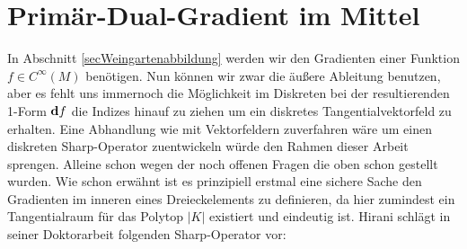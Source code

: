 \section{Primär-Dual-Gradient im Mittel}

  In Abschnitt \ref{secWeingartenabbildung} werden wir den Gradienten einer Funktion \( f\in C^{\infty}(M) \) benötigen.
  Nun können wir zwar die äußere Ableitung benutzen, aber es fehlt uns immernoch die Möglichkeit im Diskreten bei der resultierenden 
  1-Form \( \mathbf{d} f \) die Indizes hinauf zu ziehen um ein diskretes Tangentialvektorfeld zu erhalten.
  Eine Abhandlung wie mit Vektorfeldern zuverfahren wäre um einen diskreten Sharp-Operator zuentwickeln würde den Rahmen dieser Arbeit
  sprengen. Alleine schon wegen der noch offenen Fragen die oben schon gestellt wurden.
  Wie schon erwähnt ist es prinzipiell erstmal eine sichere Sache den Gradienten im inneren eines Dreieckelements zu definieren, da hier
  zumindest ein Tangentialraum für das Polytop \( |K| \) existiert und eindeutig ist.
  Hirani schlägt in seiner Doktorarbeit \cite{hirani} folgenden Sharp-Operator vor:
  

